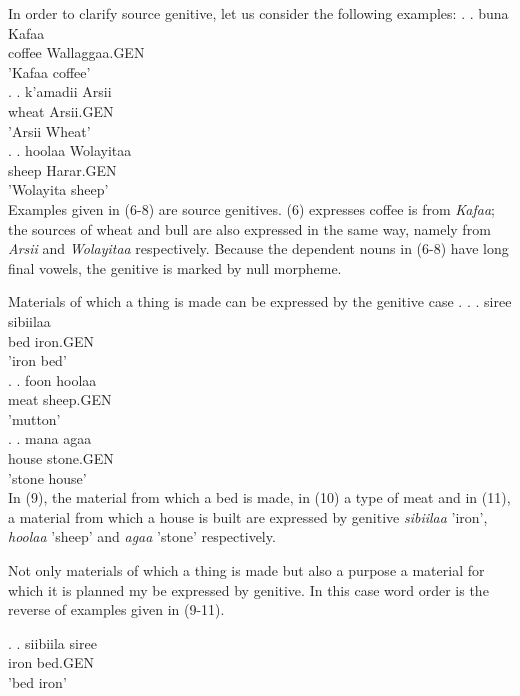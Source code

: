\documentclass[11pt,a4paper]{article}
\begin{document}
	In order to clarify source genitive, let us consider the following examples:
	\ex.
	\ag.
	buna Kafaa\\
	coffee Wallaggaa.GEN\\
	'Kafaa coffee'\\
	
	\ex.
	\ag.
	k'amadii Arsii\\
	wheat Arsii.GEN\\
	'Arsii Wheat'\\
	
	\ex.
	\ag.
	hoolaa Wolayitaa\\
	sheep Harar.GEN\\
	'Wolayita sheep'\\
	
	Examples given in (6-8) are source genitives. (6) expresses coffee is from \emph{Kafaa}; the sources of wheat and bull are also expressed in the same way, namely from \emph{Arsii} and \emph{Wolayitaa} respectively. Because the dependent nouns in (6-8) have long final vowels, the genitive is marked by null morpheme. 
	
	Materials of which a thing is made can be expressed by the genitive case \cite[69]{greenlee1950genitive}.
	\ex.
	\ag.
	siree sibiilaa\\
	bed iron.GEN\\
	'iron bed'\\
	
	\ex.
	\ag.
	foon hoolaa\\
	meat sheep.GEN\\
	'mutton'\\
	
	\ex.
	\ag.
	mana agaa\\
	house stone.GEN\\
	'stone house'\\
	
	In (9), the material from which a bed is made, in (10) a type of meat and in (11), a material from which a house is built are expressed by genitive \emph{sibiilaa} 'iron', \emph{hoolaa} 'sheep' and \emph{agaa} 'stone' respectively.
	
	Not only materials of which a thing is made but also a purpose a material for which it is planned my be expressed by genitive. In this case word order is the reverse of examples given in (9-11).
	
	\ex.
	\ag.
	siibiila siree\\
	iron bed.GEN\\
	'bed iron'\\
	
\end{document}
